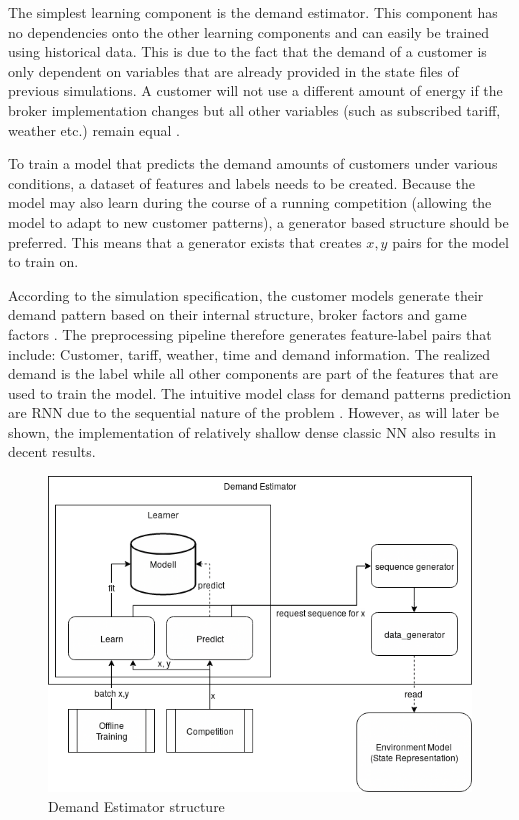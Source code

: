 {The simplest learning component is the demand estimator. This component has no dependencies onto the other learning
components and can easily be trained using historical data. This is due to the fact that the demand of a customer is
only dependent on variables that are already provided in the state files of previous simulations. A customer will not
use a different amount of energy if the broker implementation changes but all other variables (such as subscribed
tariff, weather etc.) remain equal .

To train a model that predicts the demand amounts of customers under various conditions, a dataset of features and
labels needs to be created. Because the model may also learn during the course of a running competition (allowing the
model to adapt to new customer patterns), a generator based structure should be preferred. This means that a generator
exists that creates $x, y$ pairs for the model to train on.

According to the simulation specification, the customer models generate their demand pattern based on their internal
structure, broker factors and game factors \citep[]{ketter2018powertac}. The preprocessing pipeline therefore generates
feature-label pairs that include: Customer, tariff, weather, time and demand information. The realized demand is the
label while all other components are part of the features that are used to train the model. The intuitive model class
for demand patterns prediction are \ac {RNN} due to the sequential nature of the problem \citep[]{EvalGRU2014}. However,
as will later be shown, the implementation of relatively shallow dense classic \ac {NN} also results in decent results. 

\begin{figure}[h] \centering \includegraphics[width=0.8\linewidth]{img/UsageEstimator.png} \caption{Demand Estimator
structure} \label{fig:DemandEstimator} \end{figure}


}
